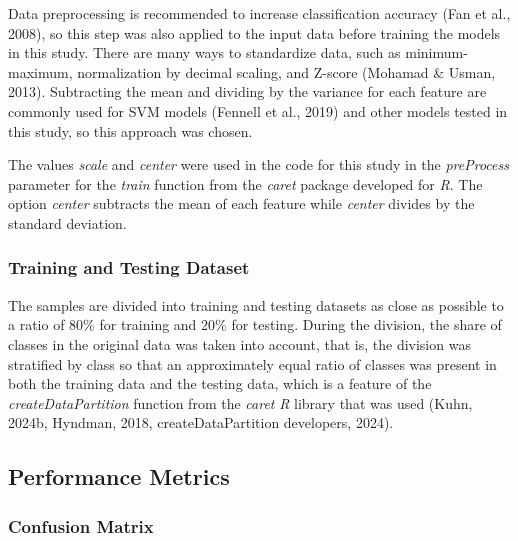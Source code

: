 \documentclass[sn-mathphys-num]{sn-jnl}%
\begin{document}
Data preprocessing is recommended to increase classification accuracy (Fan et al., 2008), so this step was also applied to the input data before training the models in this study. There are many ways to standardize data, such as minimum-maximum, normalization by decimal scaling, and Z-score (Mohamad & Usman, 2013). Subtracting the mean and dividing by the variance for each feature are commonly used for SVM models (Fennell et al., 2019) and other models tested in this study, so this approach was chosen. 

The values \textit{scale} and \textit{center} were used in the code for this study in the \textit{preProcess} parameter for the \textit{train} function from the \textit{caret} package developed for \textit{R}. The option \textit{center} subtracts the mean of each feature while \textit{center} divides by the standard deviation. 

\subsubsection{Training and Testing Dataset}

The samples are divided into training and testing datasets as close as possible to a ratio of $80\%$ for training and $20\%$ for testing. During the division, the share of classes in the original data was taken into account, that is, the division was stratified by class so that an approximately equal ratio of classes was present in both the training data and the testing data, which is a feature of the \textit{createDataPartition} function from the \textit{caret} \textit{R} library that was used (Kuhn, 2024b, Hyndman, 2018, createDataPartition developers, 2024).

\subsection{Performance Metrics}

\subsubsection{Confusion Matrix}
\end{document}

